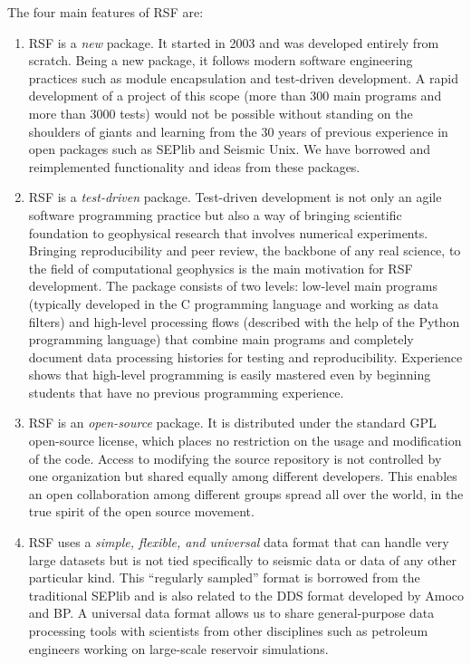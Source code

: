 The four main features of RSF are:
\begin{enumerate}
\item RSF is a \emph{new} package. It started in 2003 and was
developed entirely from scratch. Being a new package, it follows
modern software engineering practices such as module encapsulation and
test-driven development. A rapid development of a project of this
scope (more than 300 main programs and more than 3000 tests) would not
be possible without standing on the shoulders of giants and learning
from the 30 years of previous experience in open packages such as
SEPlib and Seismic Unix. We have borrowed and reimplemented
functionality and ideas from these packages.

\item RSF is a \emph{test-driven} package. Test-driven development is
not only an agile software programming practice but also a way of
bringing scientific foundation to geophysical research that involves
numerical experiments. Bringing reproducibility and peer review, the
backbone of any real science, to the field of computational geophysics
is the main motivation for RSF development. The package consists of
two levels: low-level main programs (typically developed in the C
programming language and working as data filters) and high-level
processing flows (described with the help of the Python programming
language) that combine main programs and completely document data
processing histories for testing and reproducibility. Experience
shows that high-level programming is easily mastered even by beginning
students that have no previous programming experience.

\item RSF is an \emph{open-source} package. It is distributed under
the standard GPL open-source license, which places no restriction on
the usage and modification of the code. Access to modifying the source
repository is not controlled by one organization but shared equally
among different developers. This enables an open collaboration among
different groups spread all over the world, in the true spirit of the
open source movement.

\item RSF uses a \emph{simple, flexible, and universal} data format
that can handle very large datasets but is not tied specifically to
seismic data or data of any other particular kind. This ``regularly
sampled'' format is borrowed from the traditional SEPlib and is also
related to the DDS format developed by Amoco and BP. A universal data
format allows us to share general-purpose data processing tools with
scientists from other disciplines such as petroleum engineers working
on large-scale reservoir simulations.
\end{enumerate}
